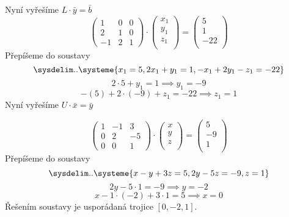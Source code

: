 Nyní vyřešíme $L\cdot \bar y = \bar b$
$$
\begin{pmatrix}
  1 & 0 & 0 \\
  2 & 1 & 0 \\
  -1 & 2 & 1 
\end{pmatrix}
\cdot
\begin{pmatrix}
  x_1 \\
  y_1 \\
  z_1 \\
\end{pmatrix}
=
\begin{pmatrix}
  5 \\
  1 \\
  -22 \\
\end{pmatrix}
$$
Přepíšeme do soustavy
\begin{equation*}
  \sysdelim..\systeme{
    x_1 = 5,
    2x_1 + y_1 = 1,
    -x_1 + 2y_1 - z_1 = -22
  }
\end{equation*}
$$2 \cdot 5 + y_1 = 1 \implies y_1 = -9$$
$$-(5) + 2 \cdot (-9) + z_1 = -22 \implies z_1 = 1$$
Nyní vyřešíme $U \cdot \bar x = \bar y$

$$
\begin{pmatrix}
  1  & -1 & 3   \\
  0  & 2 & -5   \\
  0 & 0  & 1
\end{pmatrix}
\cdot
\begin{pmatrix}
  x \\
  y \\
  z \\
\end{pmatrix}
=
\begin{pmatrix}
  5 \\
  -9 \\
  1 \\
\end{pmatrix}
$$
Přepíšeme do soustavy
\begin{equation*}
  \sysdelim..\systeme{
    x - y + 3z = 5,
      2y - 5z = -9,
    z = 1
  }
\end{equation*}
$$2y - 5 \cdot 1 = -9 \implies y = -2$$
$$x - 1 \cdot (-2) + 3 \cdot 1 = 5 \implies x = 0$$
Řešením soustavy je usporádaná trojice $\left[0, -2, 1\right]$.